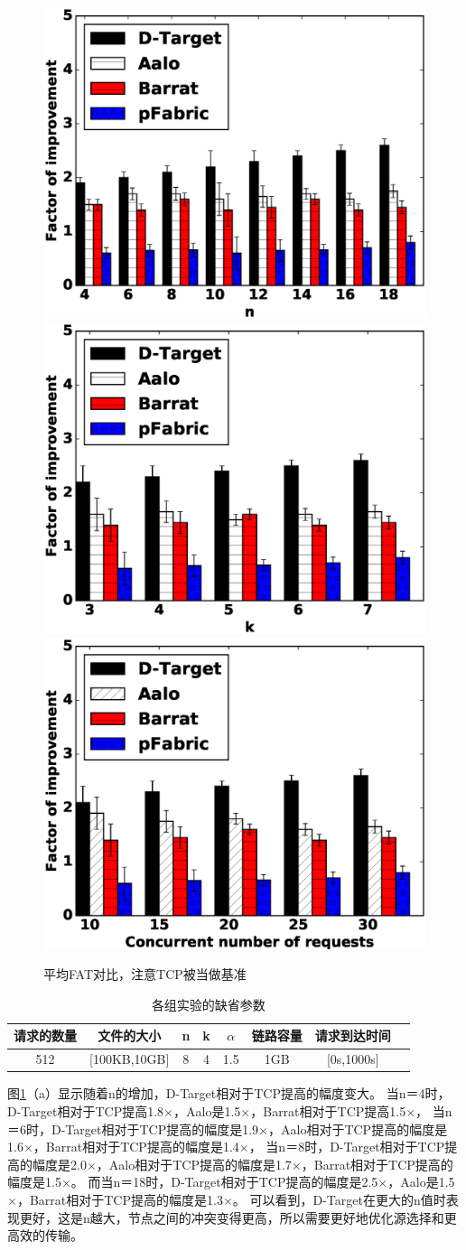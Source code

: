 \begin{figure}[h]
\centering
{}
 {\includegraphics[width=0.32\columnwidth]{figures/DTARGET/picture/evaluation/ex2/M.eps}}
{\includegraphics[width=0.32\columnwidth]{figures/DTARGET/picture//evaluation/ex2/N.eps}}
{\includegraphics[width=0.32\columnwidth]{figures/DTARGET/picture//evaluation/ex2/alpha.eps}}
\caption{平均FAT对比，注意TCP被当做基准}
\label{settings_fig}
\end{figure}

 
 \begin{table}[h]
\centering
\caption{各组实验的缺省参数}\label{default-parameter}
\renewcommand{\arraystretch}{1.5}
\begin{tabular}{|c|c|c|c|c|c|c|c|} \hline
\setlength{\tabcolsep}{10pt}
  请求的数量 &  文件的大小 & n & k &$\alpha$ &链路容量 &请求到达时间 \\ \hline
 512&  [100KB,10GB] & 8 & 4 &1.5&1GB&[0s,1000s]\\ \hline
\end{tabular}
\end{table}

图\ref{settings_fig}（a）显示随着n的增加，D-Target相对于TCP提高的幅度变大。
当n＝4时，D-Target相对于TCP提高1.8$\times$，Aalo是1.5$\times$，Barrat相对于TCP提高1.5$\times$，
当n＝6时，D-Target相对于TCP提高的幅度是1.9$\times$，Aalo相对于TCP提高的幅度是1.6$\times$，Barrat相对于TCP提高的幅度是1.4$\times$，
当n＝8时，D-Target相对于TCP提高的幅度是2.0$\times$，Aalo相对于TCP提高的幅度是1.7$\times$，Barrat相对于TCP提高的幅度是1.5$\times$。
而当n＝18时，D-Target相对于TCP提高的幅度是2.5$\times$，Aalo是1.5$\times$，Barrat相对于TCP提高的幅度是1.3$\times$。
可以看到，D-Target在更大的n值时表现更好，这是n越大，节点之间的冲突变得更高，所以需要更好地优化源选择和更高效的传输。
 
